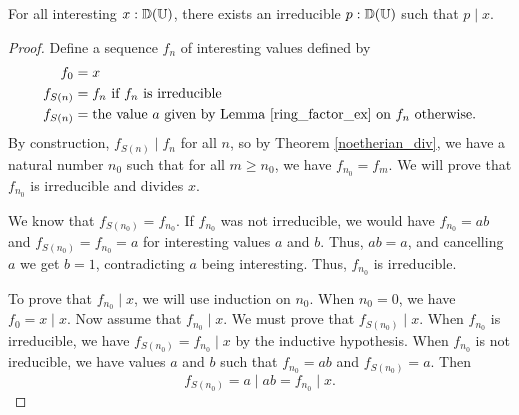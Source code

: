 \documentclass[../../math.tex]{subfiles}
\begin{document}
\begin{lemma} \label{noetherian_irreducible_ex}
    For all interesting $x : \mathbb{D}(\mathbb{U})$, there exists an irreducible $p : \mathbb{D}(\mathbb{U})$
    such that $p \mid x$.
\end{lemma}
\begin{proof}
    Define a sequence $f_n$ of interesting values defined by
    \begin{align*}
        f_0 &= x \\
        f_{S(n)} &= f_n \text{ if $f_n$ is irreducible} \\
        f_{S(n)} &= \text{the value $a$ given by Lemma \ref{ring_factor_ex} on
            $f_n$ otherwise.}
    \end{align*}
    By construction, $f_{S(n)} \mid f_n$ for all $n$, so by Theorem
    \ref{noetherian_div}, we have a natural number $n_0$ such that for all $m
    \geq n_0$, we have $f_{n_0} = f_m$.  We will prove that $f_{n_0}$ is
    irreducible and divides $x$.

    We know that $f_{S(n_0)} = f_{n_0}$.  If $f_{n_0}$ was not irreducible, we
    would have $f_{n_0} = ab$ and $f_{S(n_0)} = f_{n_0} = a$ for interesting
    values $a$ and $b$.  Thus, $ab = a$, and cancelling $a$ we get $b = 1$,
    contradicting $a$ being interesting.  Thus, $f_{n_0}$ is irreducible.

    To prove that $f_{n_0} \mid x$, we will use induction on $n_0$.  When $n_0
    = 0$, we have $f_0 = x \mid x$.  Now assume that $f_{n_0} \mid x$.  We must
    prove that $f_{S(n_0)} \mid x$.  When $f_{n_0}$ is irreducible, we have
    $f_{S(n_0)} = f_{n_0} \mid x$ by the inductive hypothesis.  When $f_{n_0}$
    is not ireducible, we have values $a$ and $b$ such that $f_{n_0} = ab$ and
    $f_{S(n_0)} = a$.  Then
    \[
        f_{S(n_0)} = a \mid ab = f_{n_0} \mid x.
    \]
\end{proof}
\end{document}
